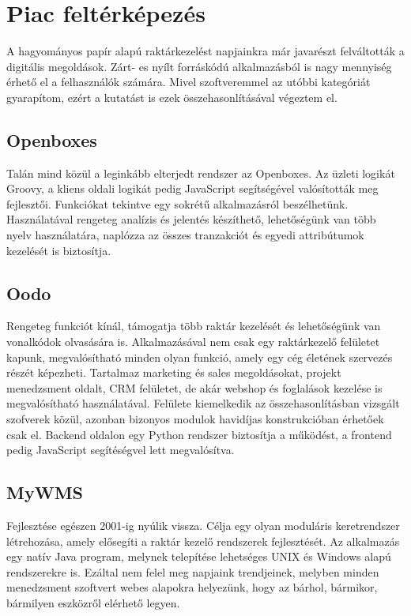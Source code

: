 \chapter{Piac feltérképezés}

A hagyományos papír alapú raktárkezelést napjainkra már javarészt felváltották a digitális megoldások.
Zárt- es nyílt forráskódú alkalmazásból is nagy mennyiség érhető el a felhasználók számára.
Mivel szoftveremmel az utóbbi kategóriát gyarapítom, ezért a kutatást is ezek összehasonlításával végeztem el.

\section{Openboxes}
Talán mind közül a leginkább elterjedt rendszer az Openboxes. Az üzleti logikát Groovy, a kliens oldali logikát pedig JavaScript segítségével valósították meg fejlesztői. \cite{OpenboxesGithub}
Funkciókat tekintve egy sokrétű alkalmazásról beszélhetünk. Használatával rengeteg analízis és jelentés készíthető, lehetőségünk van több nyelv használatára, naplózza az összes tranzakciót és egyedi attribútumok kezelését is biztosítja.\cite{Openboxes}

\section{Oodo}
Rengeteg funkciót kínál, támogatja több raktár kezelését és lehetőségünk van vonalkódok olvasására is. Alkalmazásával nem csak egy raktárkezelő felületet kapunk, megvalósítható minden olyan funkció, amely egy cég életének szervezés részét képezheti. Tartalmaz marketing és sales megoldásokat, projekt menedzsment oldalt, CRM felületet, de akár webshop és foglalások kezelése is megvalósítható használatával. \cite{Oodo}
Felülete kiemelkedik az összehasonlításban vizsgált szofverek közül, azonban bizonyos modulok havidíjas konstrukcióban érhetőek csak el.\cite{OdooPricing}
Backend oldalon egy Python rendszer biztosítja a működést, a frontend pedig JavaScript segítéségvel lett megvalósítva.\cite{OdooGithub}

\section{MyWMS}
Fejlesztése egészen 2001-ig nyúlik vissza. Célja egy olyan moduláris keretrendszer létrehozása, amely elősegíti a raktár kezelő rendszerek fejlesztését.\cite{MyWMS}
Az alkalmazás egy natív Java program, melynek telepítése lehetséges UNIX és Windows alapú rendszerekre is.\cite{MyWMSGithub}
Ezáltal nem felel meg napjaink trendjeinek, melyben minden menedzsment szoftvert webes alapokra helyezünk, hogy az bárhol, bármikor, bármilyen eszközről elérhető legyen.

